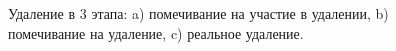 \documentclass[12pt]{report}
\begin{document}
{\begin{figure}[h!]
			\begin{minipage}[h]{0.45\linewidth}
				\center {}
			\end{minipage}
			\hfill
			\begin{minipage}[h]{0.45\linewidth}
				\center {}
			\end{minipage}
			\vfill
			\begin{minipage}[h]{0.45\linewidth}
				\center {}
			\end{minipage}
			\caption{Удаление в 3 этапа: a) помечивание на участие в удалении, b) помечивание на удаление, c) реальное удаление.}
		\end{figure}
}
\end{document}
